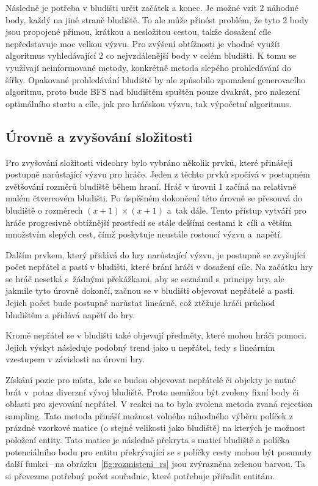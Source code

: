 Následně je potřeba v bludišti určit začátek a konec. Je možné vzít 2 náhodné body, každý na jiné straně bludiště. To ale může přinést problém, že tyto 2 body jsou propojené přímou, krátkou a nesložitou cestou, takže dosažení cíle nepředstavuje moc velkou výzvu. Pro zvýšení obtížnosti je vhodné využít algoritmus vyhledávající 2 co nejvzdálenější body v celém bludišti. K tomu se využívají neinformované metody, konkrétně metoda slepého prohledávání do šířky. Opakované prohledávání bludiště by ale způsobilo zpomalení generovacího algoritmu, proto bude BFS nad bludištěm spuštěn pouze dvakrát, pro nalezení optimálního startu a cíle, jak pro hráčskou výzvu, tak výpočetní algoritmus.

\subsection*{Úrovně a zvyšování složitosti}
Pro zvyšování složitosti videohry bylo vybráno několik prvků, které přinášejí postupně narůstající výzvu pro hráče. Jeden z těchto prvků spočívá v postupném zvětšování rozměrů bludiště během hraní. Hráč v úrovni 1 začíná na relativně malém čtvercovém bludišti. Po úspěšném dokončení této úrovně se přesouvá do bludiště o rozměrech $(x + 1) \times (x + 1)$ a~tak dále. Tento přístup vytváří pro hráče progresivně obtížnější prostředí se stále delšími cestami k~cíli a větším množstvím slepých cest, čímž poskytuje neustále rostoucí výzvu a~napětí.

Dalším prvkem, který přidává do hry narůstající výzvu, je postupně se zvyšující počet nepřátel a pastí v bludišti, které brání hráči v dosažení cíle. Na začátku hry se hráč nesetká s~žádnými překážkami, aby se seznámil s~principy hry, ale jakmile tyto úrovně dokončí, začnou se v bludišti objevovat nepřátelé a pasti. Jejich počet bude postupně narůstat lineárně, což ztěžuje hráči průchod bludištěm a přidává napětí do hry.

Kromě nepřátel se v bludišti také objevují předměty, které mohou hráči pomoci. Jejich výskyt následuje podobný trend jako u nepřátel, tedy s lineárním vzestupem v závislosti na úrovni hry.

Získání pozic pro místa, kde se budou objevovat nepřátelé či objekty je nutné brát v~potaz diverzní vývoj bludiště. Proto nemůžou být zvoleny fixní body či oblasti pro zjevování nepřátel. V reakci na to byla zvolena metoda zvaná rejection sampling. Tato metoda přináší možnost volného náhodného výběru políček z prázdné vzorkové matice (o stejné velikosti jako bludiště) na kterých je možnost položení entity. Tato matice je následně překryta s maticí bludiště a políčka potenciálního bodu pro entitu překrývající se s políčky cesty mohou být posunuty další funkci\,--\,na obrázku~\ref{fig:rozmisteni_rs} jsou zvýrazněna zelenou barvou. Ta si převezme potřebný počet souřadnic, které potřebuje přiřadit entitám.


